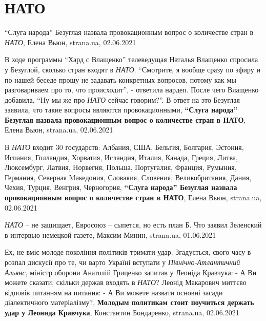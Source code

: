  
 
 
 
 
\chapter{НАТО}
\label{sec:slova.nato}

\enquote{Слуга народа} Безуглая назвала провокационным вопрос о количестве стран в \emph{НАТО},
Елена Вьюн, strana.ua, 02.06.2021

В ходе программы \enquote{Хард с Влащенко} телеведущая Наталья Влащенко
спросила у Безуглой, сколько стран входят в \emph{НАТО}.  \enquote{Смотрите, я вообще
сразу по эфиру и по нашей беседе прошу не задавать конкретных вопросов, потому
как мы разговариваем про то, что происходит}, - ответила нардеп.  После чего
Влащенко добавила, \enquote{Ну мы же про \emph{НАТО} сейчас говорим?}.  В ответ на это
Безуглая заявила, что такие вопросы являются провокационными,
\textbf{\enquote{Слуга народа} Безуглая назвала провокационным вопрос о количестве стран в НАТО},
Елена Вьюн, strana.ua, 02.06.2021

В \emph{НАТО} входит 30 государств: Албания, США, Бельгия, Болгария, Эстония, Испания,
Голландия, Хорватия, Исландия, Италия, Канада, Греция, Литва, Люксембург,
Латвия, Норвегия, Польша, Португалия, Франция, Румыния, Германия, Cеверная
Mакедония, Словакия, Словения, Великобритания, Дания, Чехия, Турция, Венгрия,
Черногория,
\textbf{\enquote{Слуга народа} Безуглая назвала провокационным вопрос о количестве стран в НАТО},
Елена Вьюн, strana.ua, 02.06.2021

\emph{НАТО} – не защищает, Евросоюз – сыпется, но есть план Б. Что заявил Зеленский в интервью немецкой газете,
Максим Минин, strana.ua, 01.06.2021

Ех, не вміє молоде покоління політиків тримати удар. Згадується, свого часу в
розпал дискусії про те, чи варто Україні вступати у \emph{Північно-Атлантичний
Альянс}, міністр оборони Анатолій Гриценко запитав у Леоніда Кравчука: - А Ви
можете сказати, скільки держав входять в \emph{НАТО}?  Леонід Макарович миттєво
відповів питанням на питання: - А Ви можете назвати основні засади
діалектичного матеріалізму?,
\textbf{Молодым политикам стоит поучиться держать удар у Леонида Кравчука}, Константин Бондаренко, strana.ua, 02.06.2021

